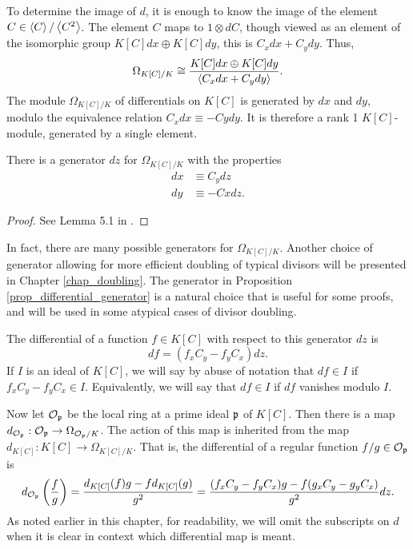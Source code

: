 To determine the image of $d$, it is enough to know the image of the element $C \in \pid C / \pid{C^2}$.
The element $C$ maps to $1 \otimes dC$, though viewed as an element of the isomorphic group
$K[C]dx \oplus K[C]dy$, this is $C_xdx + C_ydy$. Thus,
\[ \Omega_{K[C]/K} \cong \frac {K[C]dx \oplus K[C]dy} {\pid{C_xdx + C_ydy}}. \]
The module $\Omega_{K[C]/K}$ of differentials on $K[C]$ is generated by $dx$ and $dy$,
modulo the equivalence relation $C_xdx \equiv -Cydy$.
It is therefore a rank 1 $K[C]$-module, generated by a single element.
\begin{proposition}
  \label{prop_differential_generator}
  There is a generator $dz$ for $\Omega_{K[C]/K}$ with the properties
  \begin{align*}
    dx &\equiv C_ydz \\
    dy &\equiv -Cxdz.
  \end{align*}
\end{proposition}
\begin{proof}
  See Lemma 5.1 in \cite{salem07}.
\end{proof}
In fact, there are many possible generators for $\Omega_{K[C]/K}$.
Another choice of generator allowing for more efficient doubling of typical divisors
will be presented in Chapter \ref{chap_doubling}.
The generator in Proposition \ref{prop_differential_generator} is a natural choice
that is useful for some proofs, and will be used in some atypical cases of divisor doubling.

The differential of a function $f \in K[C]$ with respect to this generator $dz$ is
\[ df = (f_xC_y - f_yC_x)dz. \]
If $I$ is an ideal of $K[C]$,
we will say by abuse of notation that $df \in I$ if $f_xC_y - f_yC_x \in I$.
Equivalently, we will say that $df \in I$ if $df$ vanishes modulo $I$.

Now let $\cal O_{\frak p}$ be the local ring at a prime ideal $\frak p$ of $K[C]$.
Then there is a map $d_{\cal O_{\frak p}} : \cal O_{\frak p} \to \Omega_{\cal O_{\frak p}/K}$.
The action of this map is inherited from the map $d_{K[C]} : K[C] \to \Omega_{K[C]/K}$.
That is, the differential of a regular function $f/g \in \cal O_{\frak p}$ is
\[ d_{\cal O_{\frak p}} \left( \frac f g \right) = \frac{d_{K[C]}(f)g - fd_{K[C]}(g)}{g^2}
 = \frac{(f_xC_y - f_yC_x)g - f(g_xC_y - g_yC_x)}{g^2} dz . \]
As noted earlier in this chapter, for readability, we will omit the subscripts on $d$
when it is clear in context which differential map is meant.


